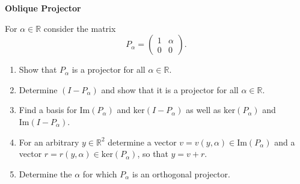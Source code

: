 \textbf{Oblique Projector}

For $\alpha\in\mathbb{R}$ consider the matrix $$P_\alpha =\begin{pmatrix}
1 & \alpha\\
0 & 0
\end{pmatrix}.$$

\begin{enumerate}
	\item Show that $P_\alpha$ is a projector for all $\alpha \in \mathbb{R}$.
	\item Determine $(I - P_\alpha)$ and show that it is a projector for all $\alpha \in \mathbb{R}$.
	\item Find a basis for $\text{Im}(P_\alpha)$ and $\text{ker}(I-P_\alpha)$ as well as $\text{ker}(P_\alpha)$ and $\text{Im}(I-P_\alpha)$.
	\item For an arbitrary $y \in \mathbb{R}^2$ determine a vector $v=v(y,\alpha) \in \text{Im}(P_\alpha)$ and a vector $r = r(y,\alpha) \in \text{ker}(P_\alpha)$, so that $y = v + r$.
	\item Determine the $\alpha$ for which $P_\alpha$ is an orthogonal projector.
\end{enumerate}